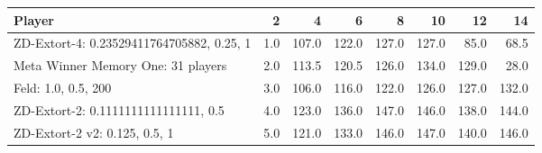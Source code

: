 \begin{tabular}{lrrrrrrr}
\toprule
                                    Player &    2 &      4 &      6 &      8 &     10 &     12 &     14 \\
\midrule
 ZD-Extort-4: 0.23529411764705882, 0.25, 1 &  1.0 &  107.0 &  122.0 &  127.0 &  127.0 &   85.0 &   68.5 \\
        Meta Winner Memory One: 31 players &  2.0 &  113.5 &  120.5 &  126.0 &  134.0 &  129.0 &   28.0 \\
                       Feld: 1.0, 0.5, 200 &  3.0 &  106.0 &  116.0 &  122.0 &  126.0 &  127.0 &  132.0 \\
      ZD-Extort-2: 0.1111111111111111, 0.5 &  4.0 &  123.0 &  136.0 &  147.0 &  146.0 &  138.0 &  144.0 \\
             ZD-Extort-2 v2: 0.125, 0.5, 1 &  5.0 &  121.0 &  133.0 &  146.0 &  147.0 &  140.0 &  146.0 \\
\bottomrule
\end{tabular}
